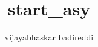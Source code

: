 \documentclass[12pt]{article}
\title{start_asy}
\author{vijayabhaskar badireddi}
\begin{document}
\begin{center}
\begin{asymptote}


\end{asymptote}
\end{center}
\end{document}
